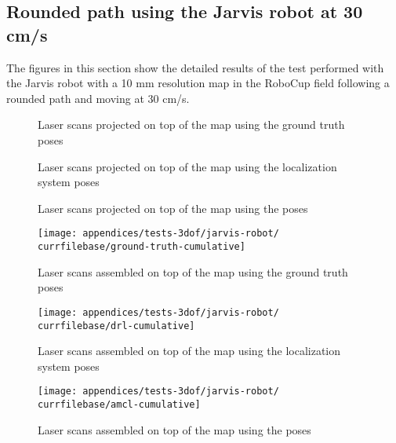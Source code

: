 \subsection{Rounded path using the Jarvis robot at 30 cm/s}\label{subsec:appendix-a_jarvis-robot-tests_rounded-path-using-the-jarvis-robot-at-30-cm-s}

The figures in this section show the detailed results of the test performed with the Jarvis robot with a 10 mm resolution map in the RoboCup field following a rounded path and moving at 30 cm/s.


\begin{figure}[H]
	\centering
	\caption{Laser scans projected on top of the map using the ground truth poses}
\end{figure}

\begin{figure}[H]
	\centering
	\caption{Laser scans projected on top of the map using the localization system poses}
\end{figure}

\begin{figure}[H]
	\centering
	\caption{Laser scans projected on top of the map using the  poses}
\end{figure}


\begin{figure}[H]
	\centering
	\texttt{[image: appendices/tests-3dof/jarvis-robot/\\currfilebase/ground-truth-cumulative]}
	\caption{Laser scans assembled on top of the map using the ground truth poses}
\end{figure}

\begin{figure}[H]
	\centering
	\texttt{[image: appendices/tests-3dof/jarvis-robot/\\currfilebase/drl-cumulative]}
	\caption{Laser scans assembled on top of the map using the localization system poses}
\end{figure}

\begin{figure}[H]
	\centering
	\texttt{[image: appendices/tests-3dof/jarvis-robot/\\currfilebase/amcl-cumulative]}
	\caption{Laser scans assembled on top of the map using the  poses}
\end{figure}


